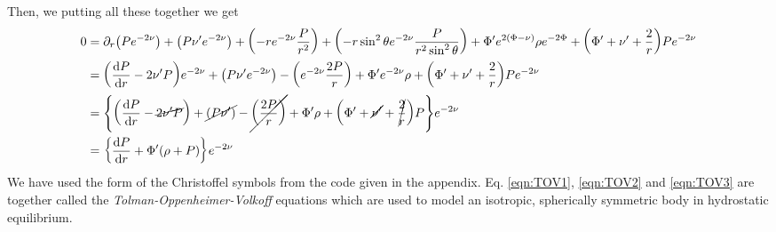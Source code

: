 Then, we putting all these together we get
\begin{align*}
    0 &=\partial_r \qty(Pe^{-2\nu}) + \qty(P\nu'e^{-2\nu}) + \qty(-re^{-2\nu}\frac{P}{r^2}) + \qty(-r\sin^2\theta e^{-2\nu}\frac{P}{r^2\sin^2\theta})+ \Phi' e^{2(\Phi - \nu)} \rho e^{-2\Phi}+\qty(\Phi'+\nu' + \frac{2}{r})Pe^{-2\nu}\\
    &=\qty(\dv{P}{r}-2\nu'P)e^{-2\nu} + \qty(P\nu'e^{-2\nu}) -\qty(e^{-2\nu}\frac{2P}{r})+ \Phi' e^{-2\nu} \rho+\qty(\Phi'+\nu' + \frac{2}{r})Pe^{-2\nu}\\
    &=\qty{\qty(\dv{P}{r}-\cancel{2\nu'P}) + \cancel{\qty(P\nu')} -\cancel{\qty(\frac{2P}{r})}+ \Phi'  \rho+\qty(\Phi'+\cancel{\nu'} + \cancel{\frac{2}{r}})P}e^{-2\nu}\\
    &=\qty{\dv{P}{r} +\Phi'(\rho+P)}e^{-2\nu}
\end{align*}
We have used the form of the Christoffel symbols from the code given in the appendix. Eq. \ref{eqn:TOV1}, \ref{eqn:TOV2} and \ref{eqn:TOV3} are together called the \textit{Tolman-Oppenheimer-Volkoff} equations which are used to model an isotropic, spherically symmetric body in hydrostatic equilibrium.
